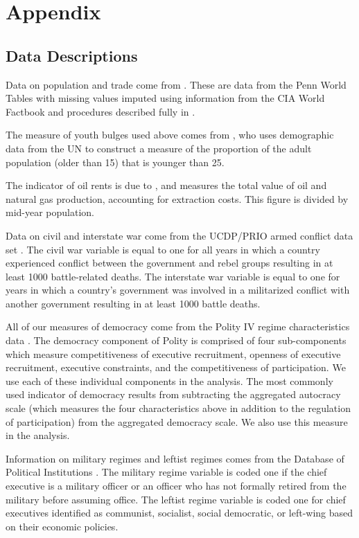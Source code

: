 \documentclass[12pt]{article}
\begin{document}
\appendix
\section{Appendix}

\subsection{Data Descriptions}

Data on population and trade come from \citet{gleditsch2002expanded}. These are data from the Penn World Tables \citep{summers1991penn} with missing values imputed using information from the CIA World Factbook and procedures described fully in \citet{gleditsch2002expanded}. 

The measure of youth bulges used above comes from \citet{Urdal2006}, who uses demographic data from the UN to construct a measure of the proportion of the adult population (older than 15) that is younger than 25.

The indicator of oil rents is due to \citet{Ross2006}, and measures the total value of oil and natural gas production, accounting for extraction costs. This figure is divided by mid-year population. 

Data on civil and interstate war come from the UCDP/PRIO armed conflict data set \citep{ThemnerWallensteen2012}. The civil war variable is equal to one for all years in which a country experienced conflict between the government and rebel groups resulting in at least 1000 battle-related deaths. The interstate war variable is equal to one for years in which a country's government was involved in a militarized conflict with another government resulting in at least 1000 battle deaths.

All of our measures of democracy come from the Polity IV regime characteristics data \citep{MarshallJaggers2009}. The democracy component of Polity is comprised of four sub-components which measure competitiveness of executive recruitment, openness of executive recruitment, executive constraints, and the competitiveness of participation. We use each of these individual components in the analysis. The most commonly used indicator of democracy results from subtracting the aggregated autocracy scale (which measures the four characteristics above in addition to the regulation of participation) from the aggregated democracy scale. We also use this measure in the analysis.  

Information on military regimes and leftist regimes comes from the Database of Political Institutions \citep{beck2001new}. The military regime variable is coded one if the chief executive is a military officer or an officer who has not formally retired from the military before assuming office. The leftist regime variable is coded one for chief executives identified as communist, socialist, social democratic, or left-wing based on their economic policies. 
\end{document}
